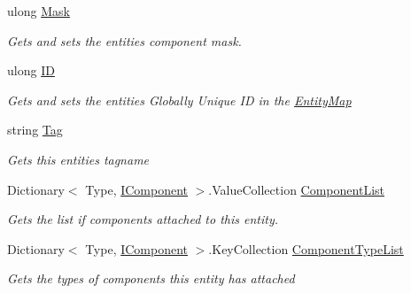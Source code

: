 \begin{DoxyCompactItemize}
\item 
ulong \hyperlink{class_m_b2_d_1_1_entity_component_1_1_entity_ada6cfb14adbc299a3b5616f833e4eb46}{Mask}
\begin{DoxyCompactList}\small\item\em Gets and sets the entities component mask. \end{DoxyCompactList}\item 
ulong \hyperlink{class_m_b2_d_1_1_entity_component_1_1_entity_a915dff6f7cff6dbf93377df68fab7c0e}{ID}
\begin{DoxyCompactList}\small\item\em Gets and sets the entities Globally Unique ID in the \hyperlink{class_m_b2_d_1_1_entity_component_1_1_entity_map}{Entity\+Map} \end{DoxyCompactList}\item 
string \hyperlink{class_m_b2_d_1_1_entity_component_1_1_entity_aa16727c7f2228b661fe6b374721fb4f7}{Tag}
\begin{DoxyCompactList}\small\item\em Gets this entities tagname \end{DoxyCompactList}\item 
Dictionary$<$ Type, \hyperlink{interface_m_b2_d_1_1_entity_component_1_1_i_component}{I\+Component} $>$.Value\+Collection \hyperlink{class_m_b2_d_1_1_entity_component_1_1_entity_ae15b38df98affb3a58dc53c4a1140f3e}{Component\+List}
\begin{DoxyCompactList}\small\item\em Gets the list if components attached to this entity. \end{DoxyCompactList}\item 
Dictionary$<$ Type, \hyperlink{interface_m_b2_d_1_1_entity_component_1_1_i_component}{I\+Component} $>$.Key\+Collection \hyperlink{class_m_b2_d_1_1_entity_component_1_1_entity_abd8ccf1511e8c825ee2574b3bc7af158}{Component\+Type\+List}
\begin{DoxyCompactList}\small\item\em Gets the types of components this entity has attached \end{DoxyCompactList}\item 

\end{DoxyCompactItemize}
